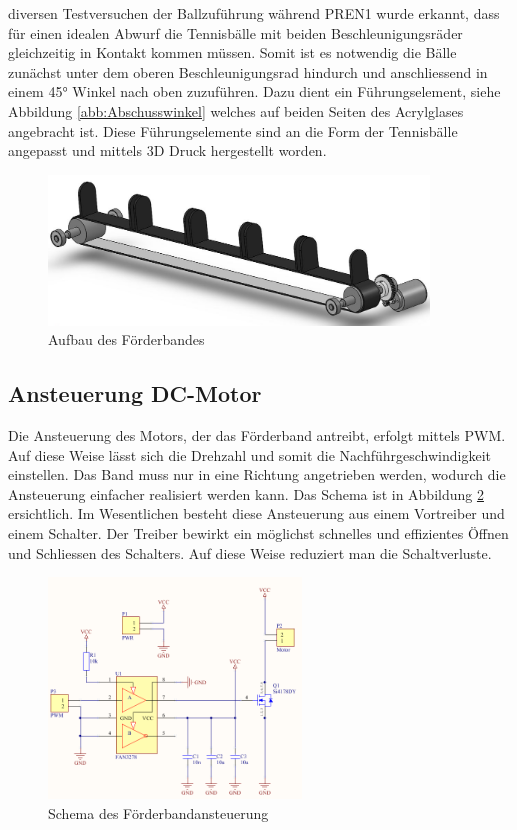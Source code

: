 	diversen Testversuchen der Ballzuführung während PREN1 wurde erkannt, dass 
	für einen idealen Abwurf die Tennisbälle mit beiden Beschleunigungsräder 
	gleichzeitig in Kontakt kommen müssen. Somit ist es notwendig die Bälle 
	zunächst unter dem oberen Beschleunigungsrad hindurch und anschliessend in 
	einem 45\si{\degree} Winkel nach oben zuzuführen. Dazu dient ein Führungselement, 
	siehe Abbildung \ref{abb:Abschusswinkel}
	welches auf beiden Seiten des Acrylglases angebracht ist. Diese 
	Führungselemente sind an die Form der Tennisbälle angepasst und mittels 
	3D Druck hergestellt worden. 
	\begin{figure}[h!]
    	\includegraphics[width=0.9\textwidth,clip,trim=0mm 0mm 0mm 0mm]
    	{Enddokumentation/Bilder/Foerderband.jpg}
    	\centering
    	\caption{Aufbau des Förderbandes}
    	\label{abb:Foerderband}
 	\end{figure}
\newpage
\subsection{Ansteuerung DC-Motor}
\label{sec:FoerderbandAnsteuerung}
    Die Ansteuerung des Motors, der das Förderband antreibt, erfolgt mittels PWM. Auf diese 
    Weise lässt sich die Drehzahl und somit die Nachführgeschwindigkeit einstellen. Das 
    Band muss nur in eine Richtung angetrieben werden, wodurch die Ansteuerung einfacher 
    realisiert werden kann. Das Schema ist in Abbildung \ref{abb:SchemaAnsteuerung} 
    ersichtlich. Im Wesentlichen besteht diese Ansteuerung aus einem Vortreiber und einem 
    Schalter. Der Treiber bewirkt ein möglichst schnelles und effizientes Öffnen und Schliessen des Schalters. Auf diese Weise reduziert man die Schaltverluste. 
    \begin{figure}[h!]
    	\includegraphics[width=0.6\textwidth,clip,trim=0mm 2mm 0mm 7mm]
    	{Enddokumentation/Bilder/Schema_DC-Ansteuerung.png}
    	\centering
    	\caption{Schema des Förderbandansteuerung}
    	\label{abb:SchemaAnsteuerung}
    \end{figure}